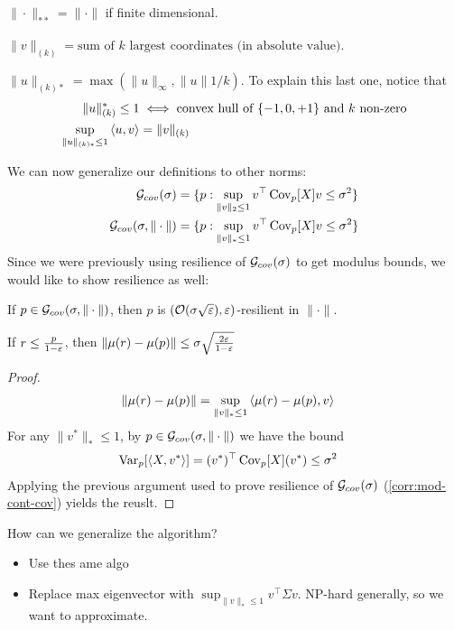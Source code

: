 \begin{theorem}
  $\|\cdot\|_{**} = \|\cdot\|$ if finite dimensional.

  $\|v\|_{(k)} = \text{sum of $k$ largest coordinates (in absolute value)}$.

  $\|u\|_{(k)*} = \max(\|u\|_\infty, \|u\|1 / k)$.
  To explain this last one, notice that
  \begin{align}
    \|u\|_{(k)}^* \leq 1 &\iff \text{convex hull of $\{-1,0,+1\}$ and $k$ non-zero} \\
    \sup_{\|u\|_{(k)*} \leq 1} \braket{u,v} &= \|v\|_{(k)}
  \end{align}
\end{theorem}

We can now generalize our definitions to other norms:
\begin{align}
  \mathcal{G}_{cov}(\sigma) &= \{ p : \sup_{\|v\|_2 \leq 1} v^\top \operatorname{Cov}_p[X] v \leq \sigma^2 \} \\
  \mathcal{G}_{cov}(\sigma, \|\cdot\|) &= \{ p : \sup_{\|v\|_* \leq 1} v^\top \operatorname{Cov}_p[X] v \leq \sigma^2 \} \label{eq:bdd-cov-other-norms}
\end{align}
Since we were previously using resilience of $\mathcal{G}_{cov}(\sigma)$ to get
modulus bounds, we would like to show resilience as well:
\begin{proposition}
  If $p \in \mathcal{G}_{cov}(\sigma, \|\cdot\|)$, then
  $p$ is $(\mathcal{O}(\sigma \sqrt{\varepsilon}), \varepsilon)$-resilient in $\|\cdot\|$.

  If $r \leq \frac{p}{1-\varepsilon}$, then
  $\|\mu(r) - \mu(p)\| \leq \sigma \sqrt{\frac{2 \varepsilon}{1-\varepsilon}}$
\end{proposition}

\begin{proof}
  \begin{align}
    \|\mu(r) - \mu(p) \|
    &= \sup_{\|v\|_* \leq 1} \braket{\mu(r) - \mu(p), v}
  \end{align}
  For any $\|v^*\|_* \leq 1$, by $p \in \mathcal{G}_{cov}(\sigma, \|\cdot\|)$
  we have the bound
  \begin{align}
    \operatorname{Var}_p[\braket{X, v^*}] &= (v^*)^\top \operatorname{Cov}_p[X] (v^*) \leq \sigma^2
  \end{align}
  Applying the previous argument used to prove resilience of $\mathcal{G}_{cov}(\sigma)$
  (\cref{corr:mod-cont-cov}) yields the reuslt.
\end{proof}

How can we generalize the algorithm?

\begin{itemize}
  \item Use thes ame algo
  \item Replace max eigenvector with $\sup_{\|v\|_* \leq 1} v^\top \Sigma v$.
    NP-hard generally, so we want to approximate.
\end{itemize}

